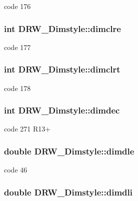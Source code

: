 code 176 \hypertarget{classDRW__Dimstyle_ad603cb462dc00136ff50933979b0aab7}{
\subsubsection[{dimclre}]{\setlength{\rightskip}{0pt plus 5cm}int D\-R\-W\-\_\-\-Dimstyle\-::dimclre}}\label{classDRW__Dimstyle_ad603cb462dc00136ff50933979b0aab7}
code 177 \hypertarget{classDRW__Dimstyle_ae89e4a003314815b40b00c26b0cb0ba0}{
\subsubsection[{dimclrt}]{\setlength{\rightskip}{0pt plus 5cm}int D\-R\-W\-\_\-\-Dimstyle\-::dimclrt}}\label{classDRW__Dimstyle_ae89e4a003314815b40b00c26b0cb0ba0}
code 178 \hypertarget{classDRW__Dimstyle_af71e0007f9eaddb929e7c405fdb365bb}{
\subsubsection[{dimdec}]{\setlength{\rightskip}{0pt plus 5cm}int D\-R\-W\-\_\-\-Dimstyle\-::dimdec}}\label{classDRW__Dimstyle_af71e0007f9eaddb929e7c405fdb365bb}
code 271 R13+ \hypertarget{classDRW__Dimstyle_a7aebc776b75660bc9947a90416bf8ab4}{
\subsubsection[{dimdle}]{\setlength{\rightskip}{0pt plus 5cm}double D\-R\-W\-\_\-\-Dimstyle\-::dimdle}}\label{classDRW__Dimstyle_a7aebc776b75660bc9947a90416bf8ab4}
code 46 \hypertarget{classDRW__Dimstyle_a6d13f43f1689621623c4193501ddb5cc}{
\subsubsection[{dimdli}]{\setlength{\rightskip}{0pt plus 5cm}double D\-R\-W\-\_\-\-Dimstyle\-::dimdli}}\label{classDRW__Dimstyle_a6d13f43f1689621623c4193501ddb5cc}
